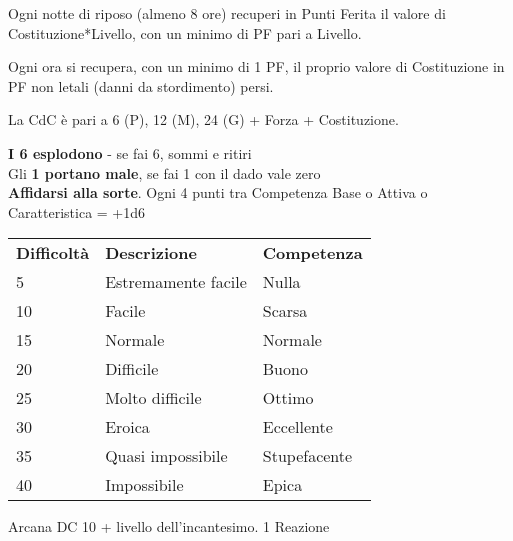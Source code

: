 \documentclass[landscape,10pt,a4paper]{article}
\begin{document}
\begin{multicols}{3}
\begin{dmbox}[title=Riposare 8 ore - pagina \pageref{recuperarepf}]
Ogni notte di riposo (almeno 8 ore) recuperi in Punti Ferita il valore di Costituzione*Livello, con un minimo di PF pari a Livello.
\end{dmbox}


\begin{dmbox}[title=Danni non letali - pagina \pageref{recuperopuntiferitanonletali}]
Ogni ora si recupera, con un minimo di 1 PF, il proprio valore di Costituzione in PF non letali (danni da stordimento) persi.
\end{dmbox}



\begin{dmbox}[title=Capacità di Carico - pagina \pageref{capacitadicarico}]
La CdC è pari a 6 (P), 12 (M), 24 (G) + Forza + Costituzione.
\end{dmbox}


\begin{dmbox}[title=Golden Rules - pagina \pageref{goldenrules}]
{\textbf{I 6 esplodono}} - se fai 6, sommi e ritiri\\
Gli \textbf{1 portano male}, se fai 1 con il dado vale zero\\
\textbf{Affidarsi alla sorte}. Ogni 4 punti tra Competenza Base o Attiva o Caratteristica = +1d6
\end{dmbox}



\begin{dmbox}[title=Difficoltà e Competenza - pagina \pageref{basedifficolta}]
\begin{tabular}{lll}
\textbf{Difficoltà} & \textbf{Descrizione} & \textbf{Competenza} \\
5 & Estremamente facile  & Nulla\\
10  & Facile & Scarsa\\
15  & Normale  & Normale\\
20  & Difficile  & Buono\\
25  & Molto difficile  & Ottimo\\
30  & Eroica   & Eccellente\\
35  & Quasi impossibile & Stupefacente\\
40  & Impossibile  & Epica\\
\end{tabular}
\end{dmbox}


\begin{dmbox}[title=Riconoscere un incantesimo - pagina \pageref{riconoscereincantesimo}]
	Arcana DC 10 + livello dell'incantesimo. 1 Reazione
\end{dmbox}



\end{multicols}
\end{document}
